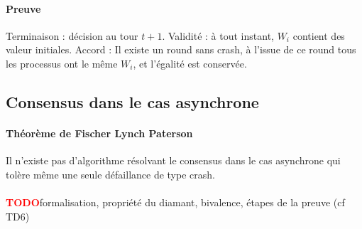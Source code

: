 \documentclass[french]{article}
\newcommand{\TODO}{\textcolor{red}{\textbf{TODO}}}
\begin{document}
\paragraph{Preuve} Terminaison : décision au tour $t + 1$. Validité : à tout instant, $W_i$ contient des valeur initiales. Accord : Il existe un round sans crash, à l'issue de ce round tous les processus ont le même $W_i$, et l'égalité est conservée.


\subsection{Consensus dans le cas asynchrone}

\paragraph{Théorème de Fischer Lynch Paterson}Il n'existe pas d'algorithme résolvant le consensus dans le cas asynchrone qui tolère même une seule défaillance de type crash.

\paragraph{}\TODO formalisation, propriété du diamant, bivalence, étapes de la preuve (cf TD6)
\end{document}
